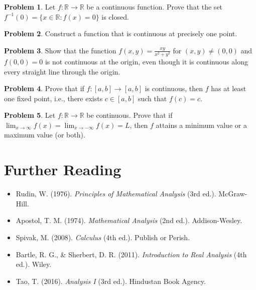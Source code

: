 \documentclass[12pt,a4paper]{article}
\theoremstyle{plain}
\theoremstyle{definition}
\newtheorem{problem}{Problem}[section]
\begin{document}
\begin{problem}
Let $f: \mathbb{R} \to \mathbb{R}$ be a continuous function. Prove that the set $f^{-1}(0) = \{x \in \mathbb{R} : f(x) = 0\}$ is closed.
\end{problem}

\begin{problem}
Construct a function that is continuous at precisely one point.
\end{problem}

\begin{problem}
Show that the function $f(x, y) = \frac{xy}{x^2 + y^2}$ for $(x, y) \neq (0, 0)$ and $f(0, 0) = 0$ is not continuous at the origin, even though it is continuous along every straight line through the origin.
\end{problem}

\begin{problem}
Prove that if $f: [a, b] \to [a, b]$ is continuous, then $f$ has at least one fixed point, i.e., there exists $c \in [a, b]$ such that $f(c) = c$.
\end{problem}

\begin{problem}
Let $f: \mathbb{R} \to \mathbb{R}$ be continuous. Prove that if $\lim_{x \to \infty} f(x) = \lim_{x \to -\infty} f(x) = L$, then $f$ attains a minimum value or a maximum value (or both).
\end{problem}

\section{Further Reading}

\begin{itemize}
\item Rudin, W. (1976). \textit{Principles of Mathematical Analysis} (3rd ed.). McGraw-Hill.
\item Apostol, T. M. (1974). \textit{Mathematical Analysis} (2nd ed.). Addison-Wesley.
\item Spivak, M. (2008). \textit{Calculus} (4th ed.). Publish or Perish.
\item Bartle, R. G., \& Sherbert, D. R. (2011). \textit{Introduction to Real Analysis} (4th ed.). Wiley.
\item Tao, T. (2016). \textit{Analysis I} (3rd ed.). Hindustan Book Agency.
\end{itemize}
\end{document}
